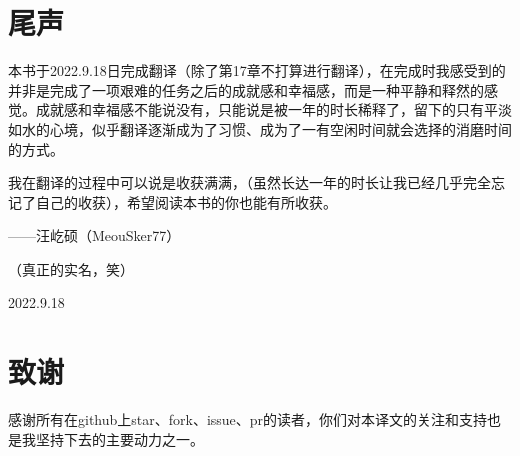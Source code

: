 \section*{尾声}
本书于2022.9.18日完成翻译（除了第17章不打算进行翻译），在完成时我感受到的并非是完成了一项艰难的任务之后的成就感和幸福感，而是一种平静和释然的感觉。成就感和幸福感不能说没有，只能说是被一年的时长稀释了，留下的只有平淡如水的心境，似乎翻译逐渐成为了习惯、成为了一有空闲时间就会选择的消磨时间的方式。

我在翻译的过程中可以说是收获满满，（虽然长达一年的时长让我已经几乎完全忘记了自己的收获），希望阅读本书的你也能有所收获。

\begin{flushright}
    ——汪屹硕（MeouSker77）

    （真正的实名，笑）

    2022.9.18
\end{flushright}

\section*{致谢}
感谢所有在github上star、fork、issue、pr的读者，你们对本译文的关注和支持也是我坚持下去的主要动力之一。